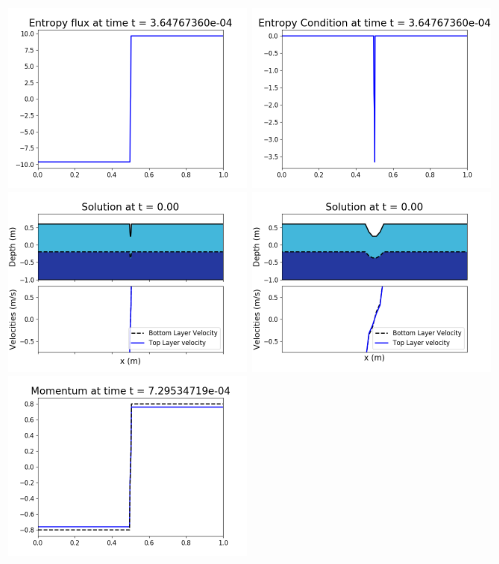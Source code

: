 \documentclass[11pt]{article}
\begin{document}
\includegraphics[width=0.475\textwidth]{frame0002fig1008.png}
\vskip 10pt 
\includegraphics[width=0.475\textwidth]{frame0002fig1009.png}
\vskip 10pt 
\includegraphics[width=0.475\textwidth]{frame0003fig1001.png}
\includegraphics[width=0.475\textwidth]{frame0003fig1002.png}
\vskip 10pt 
\includegraphics[width=0.475\textwidth]{frame0003fig1003.png}
\end{document}
